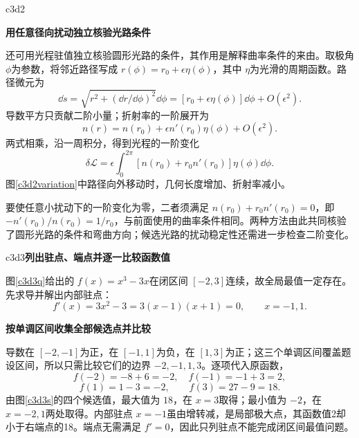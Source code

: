 \begin{drillsolution}{c3d2}
\par\medskip{}\noindent\textbf{用任意径向扰动独立核验光路条件}\par\nobreak
还可用光程驻值独立核验圆形光路的条件，其作用是解释曲率条件的来由。取极角 $\phi$为参数，将邻近路径写成 $r(\phi)=r_0+\epsilon\eta(\phi)$，其中 $\eta$为光滑的周期函数。路径微元为
\[\dd s=\sqrt{r^2+(\dd r/\dd\phi)^2}\dd\phi
 =[r_0+\epsilon\eta(\phi)]\dd\phi+O(\epsilon^2).\]
导数平方只贡献二阶小量；折射率的一阶展开为
\[n(r)=n(r_0)+\epsilon n'(r_0)\eta(\phi)+O(\epsilon^2).\]
两式相乘，沿一周积分，得到光程的一阶变化
\[\delta\mathcal L=\epsilon\int_0^{2\pi}
 [n(r_0)+r_0n'(r_0)]\eta(\phi)\dd\phi.\]
图\ref{c3d2variation}中路径向外移动时，几何长度增加、折射率减小。

要使任意小扰动下的一阶变化为零，二者须满足 $n(r_0)+r_0n'(r_0)=0$，即 $-n'(r_0)/n(r_0)=1/r_0$，与前面使用的曲率条件相同。两种方法由此共同核验了圆形光路的条件和弯曲方向；候选光路的扰动稳定性还需进一步检查二阶变化。
\end{drillsolution}
\begin{drillsolution}{c3d3}\textbf{列出驻点、端点并逐一比较函数值}\par\nobreak
图\ref{c3d3q}给出的 $f(x)=x^3-3x$在闭区间 $[-2,3]$连续，故全局最值一定存在。先求导并解出内部驻点：
\[f'(x)=3x^2-3=3(x-1)(x+1)=0,
\qquad x=-1,1.\]


\par\medskip{}\noindent\textbf{按单调区间收集全部候选点并比较}\par\nobreak
导数在 $[-2,-1]$为正，在 $[-1,1]$为负，在 $[1,3]$为正；这三个单调区间覆盖题设区间，所以只需比较它们的边界 $-2,-1,1,3$。逐项代入原函数，
\[f(-2)=-8+6=-2,\quad f(-1)=-1+3=2,\]
\[f(1)=1-3=-2,\qquad f(3)=27-9=18.\]
由图\ref{c3d3s}的四个候选值，最大值为 $18$，在 $x=3$取得；最小值为 $-2$，在 $x=-2,1$两处取得。内部驻点 $x=-1$虽由增转减，是局部极大点，其函数值2却小于右端点的18。端点无需满足 $f'=0$，因此只列驻点不能完成闭区间最值问题。
\end{drillsolution}
